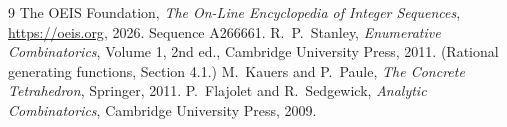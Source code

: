 \documentclass[11pt,a4paper]{article}
\theoremstyle{plain}
\theoremstyle{definition}
\begin{document}
\begin{thebibliography}{9}
 The OEIS Foundation, \emph{The On-Line Encyclopedia of Integer
Sequences}, \url{https://oeis.org}, 2026. Sequence A266661.
 R.~P.~Stanley, \emph{Enumerative Combinatorics}, Volume 1, 2nd ed.,
Cambridge University Press, 2011. (Rational generating functions, Section 4.1.)
 M.~Kauers and P.~Paule, \emph{The Concrete Tetrahedron}, Springer, 2011.
 P.~Flajolet and R.~Sedgewick, \emph{Analytic Combinatorics}, Cambridge
University Press, 2009.
\end{thebibliography}
\end{document}

